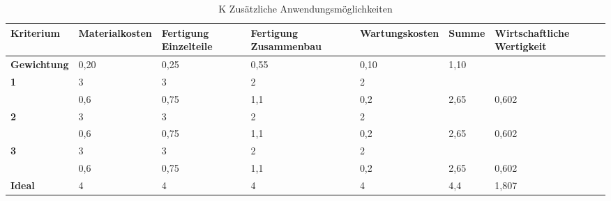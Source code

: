 \documentclass[10pt,a4paper]{article}
\begin{document}
\begin{table}[h!]
    \centering
    \hspace*{0in} %
    \begin{tabular}{>{\bfseries}p{2cm} p{2.2cm} p{2cm} p{2cm} p{2.5cm} p{2cm} p{2cm}}
        \toprule
        Kriterium  & Materialkosten & Fertigung Einzelteile & Fertigung Zusammenbau & Wartungskosten & Summe & Wirtschaftliche Wertigkeit \\
        \midrule
        Gewichtung & 0,20           & 0,25                  & 0,55                  & 0,10           & 1,10  &                            \\
        \midrule
        1          & 3              & 3                     & 2                     & 2              &       &                            \\
                   & 0,6            & 0,75                  & 1,1                   & 0,2            & 2,65  & 0,602                      \\
        \midrule
        2          & 3              & 3                     & 2                     & 2              &       &                            \\
                   & 0,6            & 0,75                  & 1,1                   & 0,2            & 2,65  & 0,602                      \\
        \midrule
        3          & 3              & 3                     & 2                     & 2              &       &                            \\
                   & 0,6            & 0,75                  & 1,1                   & 0,2            & 2,65  & 0,602                      \\
        \midrule
        Ideal      & 4              & 4                     & 4                     & 4              & 4,4   & 1,807                      \\
        \bottomrule
    \end{tabular}
    \caption{K Zusätzliche Anwendungsmöglichkeiten}
\end{table}
\end{document}
